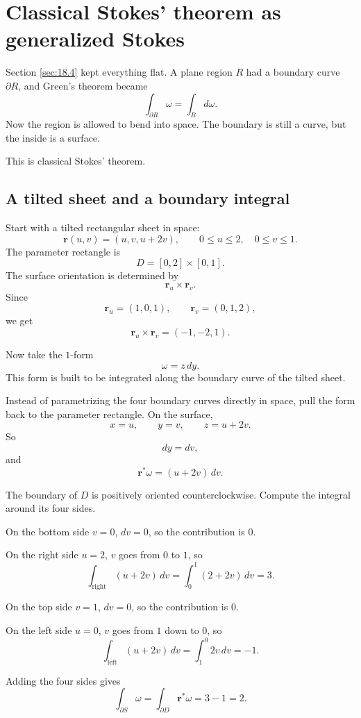\section{Classical Stokes' theorem as generalized Stokes}
\label{sec:18.5}

Section \ref{sec:18.4} kept everything flat.  A plane region \(R\) had a boundary
curve \(\partial R\), and Green's theorem became
\[
    \int_{\partial R}\omega=\int_R d\omega.
\]
Now the region is allowed to bend into space.  The boundary is still a curve, but the
inside is a surface.

This is classical Stokes' theorem.

\subsection{A tilted sheet and a boundary integral}

Start with a tilted rectangular sheet in space:
\[
    \mathbf r(u,v)=(u,v,u+2v),
    \qquad
    0\le u\le2,\quad 0\le v\le1.
\]
The parameter rectangle is
\[
    D=[0,2]\times[0,1].
\]
The surface orientation is determined by
\[
    \mathbf r_u\times\mathbf r_v.
\]
Since
\[
    \mathbf r_u=(1,0,1),
    \qquad
    \mathbf r_v=(0,1,2),
\]
we get
\[
    \mathbf r_u\times\mathbf r_v=(-1,-2,1).
\]

Now take the \(1\)-form
\[
    \omega=z\,dy.
\]
This form is built to be integrated along the boundary curve of the tilted sheet.

Instead of parametrizing the four boundary curves directly in space, pull the form back
to the parameter rectangle.  On the surface,
\[
    x=u,\qquad y=v,\qquad z=u+2v.
\]
So
\[
    dy=dv,
\]
and
\[
    \mathbf r^*\omega=(u+2v)\,dv.
\]

The boundary of \(D\) is positively oriented counterclockwise.  Compute the integral
around its four sides.

On the bottom side \(v=0\), \(dv=0\), so the contribution is \(0\).

On the right side \(u=2\), \(v\) goes from \(0\) to \(1\), so
\[
    \int_{\text{right}}(u+2v)\,dv
    =
    \int_0^1(2+2v)\,dv
    =
    3.
\]

On the top side \(v=1\), \(dv=0\), so the contribution is \(0\).

On the left side \(u=0\), \(v\) goes from \(1\) down to \(0\), so
\[
    \int_{\text{left}}(u+2v)\,dv
    =
    \int_1^0 2v\,dv
    =
    -1.
\]

Adding the four sides gives
\[
\boxed{
    \int_{\partial S}\omega
    =
    \int_{\partial D}\mathbf r^*\omega
    =
    3-1
    =
    2.
}
\]

